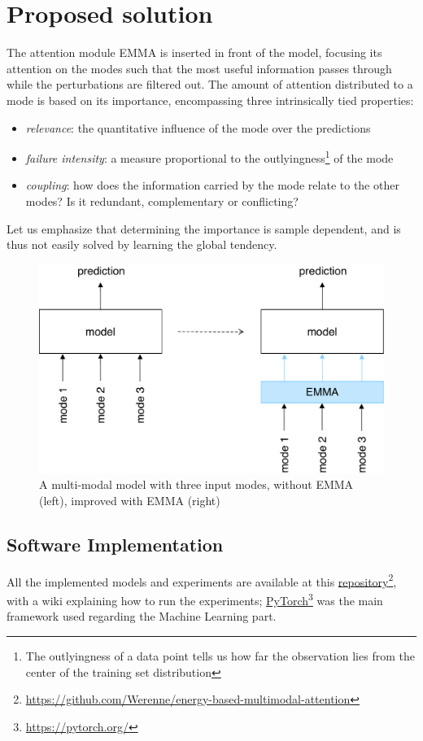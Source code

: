 \section{Proposed solution}\label{sec:proposed-solution}
The attention module EMMA is inserted in front of the model, focusing its attention on the modes such that the most useful information passes through while the perturbations are filtered out. The amount of attention distributed to a mode is based on its importance, encompassing three intrinsically tied properties:
\begin{itemize}
\item \textit{relevance}: the quantitative influence of the mode over the predictions
\item \textit{failure intensity}: a measure proportional to the outlyingness\footnote{The outlyingness of a data point tells us how far the observation lies from the center of the training set distribution} of the mode
\item \textit{coupling}: how does the information carried by the mode relate to the other modes? Is it redundant, complementary or conflicting?
\end{itemize}
Let us emphasize that determining the importance is sample dependent, and is thus not easily solved by learning the global tendency.
\begin{figure}[!h]
\centering
\includegraphics[scale=0.45]{figures/introduction-three-modes-with-emma}
\caption[Multi-Modal model with/without EMMA]{A multi-modal model with three input modes, without EMMA (left), improved with EMMA (right)}	
\label{fig:main-idea}
\end{figure}

\subsection*{Software Implementation}
All the implemented models and experiments are available at this \href{https://github.com/Werenne/energy-based-multimodal-attention}{repository}\footnote{\url{https://github.com/Werenne/energy-based-multimodal-attention}}, with a wiki explaining how to run the experiments; \href{https://pytorch.org/}{PyTorch}\footnote{\url{https://pytorch.org/}} was the main framework used regarding the Machine Learning part.

